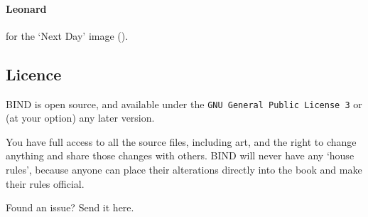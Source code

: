 \begin{multicols}{2}
\paragraph{Leonard}
for the `Next Day' image ().

\subsection*{Licence}

BIND is open source, and available under the {\tt GNU General Public License 3} or (at your option) any later version.

You have full access to all the source files, including art, and the right to change anything and share those changes with others.
BIND will never have any `house rules', because anyone can place their alterations directly into the book and make their rules official.

\begin{center}
  
  Found an issue?
  Send it here.
\end{center}

\end{multicols}
